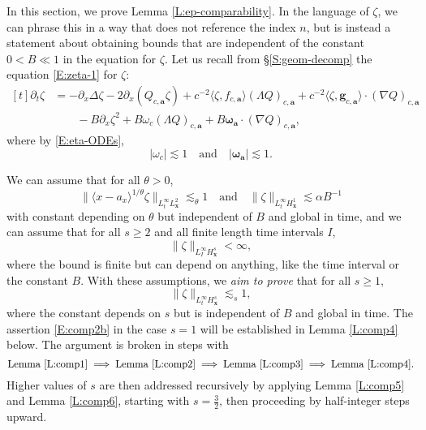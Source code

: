 \documentclass[12pt,letterpaper]{amsart}
\newcommand{\la}{\langle}
\newcommand{\ra}{\rangle}
\theoremstyle{remark}
\numberwithin{equation}{section}
\numberwithin{theorem}{section}
\numberwithin{table}{section}
\begin{document}
In this section, we prove Lemma \ref{L:ep-comparability}.    In the language of $\zeta$, we can phrase this in a way that does not reference the index $n$, but is instead a statement about obtaining bounds that are independent of the constant $0<B\ll 1$ in the equation for $\zeta$.  Let us recall from \S\ref{S:geom-decomp} the equation \eqref{E:zeta-1} for $\zeta$:
\begin{equation}
\label{E:zeta-1p}
\begin{aligned}[t]
\partial_t \zeta &= - \partial_x \Delta \zeta - 2 \partial_x ( Q_{c,\mathbf{a}} \zeta) + c^{-2} \la \zeta, f_{c,\mathbf{a}}\ra (\Lambda Q)_{c,\mathbf{a}} + c^{-2}\la \zeta, \mathbf{g}_{c,\mathbf{a}} \ra \cdot (\nabla Q)_{c,\mathbf{a}}
 \\
& \qquad - B \partial_x \zeta^2 + B \omega_c (\Lambda Q)_{c,\mathbf{a}} + B\boldsymbol{\omega}_{\mathbf{a}} \cdot (\nabla Q)_{c,\mathbf{a}},
\end{aligned}
\end{equation}
where by \eqref{E:eta-ODEs}, 
$$
|\omega_c| \lesssim 1 \quad \mbox{and} \quad |\boldsymbol{\omega}_{\mathbf{a}}| \lesssim 1.
$$

We can assume that for all $\theta>0$,
\begin{equation}
\label{E:comp1}
\| \la x-a_x\ra^{1/\theta} \zeta\|_{L_t^\infty L_{\mathbf{x}}^2} \lesssim_\theta 1 \quad \mbox{and} \quad
\| \zeta \|_{L_t^\infty H_{\mathbf{x}}^1} \lesssim \alpha B^{-1}
\end{equation}
with constant depending on $\theta$ but independent of $B$ and global in time, and we can assume that for all $s\geq 2$ and all finite length time intervals $I$, 
\begin{equation}
\label{E:comp2}
\| \zeta \|_{L_I^\infty H_{\mathbf{x}}^s} < \infty,
\end{equation}
where the bound is finite but can depend on anything, like the time interval or the constant $B$.  With these assumptions, we \emph{aim to prove} that for all $s \geq 1$, 
\begin{equation}
\label{E:comp2b}
\| \zeta \|_{L_t^\infty H_{\mathbf{x}}^s} \lesssim_s 1,
\end{equation}
where the constant  depends on $s$ but is independent of $B$ and global in time.  The assertion \eqref{E:comp2b} in the case $s=1$ will be established in Lemma \ref{L:comp4} below.  The argument is broken in steps with
$$
\text{Lemma }\ref{L:comp1} \implies \text{Lemma }\ref{L:comp2} \implies  \text{Lemma }\ref{L:comp3}  \implies \text{Lemma }\ref{L:comp4}.
$$
Higher values of $s$ are then addressed recursively by applying Lemma \ref{L:comp5} and Lemma \ref{L:comp6}, starting with $s=\frac32$, then proceeding by half-integer steps upward.
\end{document}
